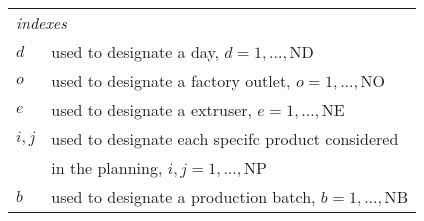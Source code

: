 \begin{table}[h!]
\begin{center}
\footnotesize
	\begin{tabular}{ l l } 
		\multicolumn{2}{l}{\emph{indexes}} \\

		$d$ & used to designate a day, $d = 1, ..., \mathrm{ND}$ \\
		$o$ & used to designate a factory outlet, $o = 1, ..., \mathrm{NO}$  \\
		$e$ & used to designate a extruser, $e = 1, ..., \mathrm{NE}$\\
		$i, j$ & used to designate each specifc product considered  \\
		& in the planning, $i, j = 1, ..., \mathrm{NP}$ \\
		$b$ & used to designate a production batch, $b = 1, ..., \mathrm{NB}$ \\
		

\end{tabular}
\end{center}
\end{table}
